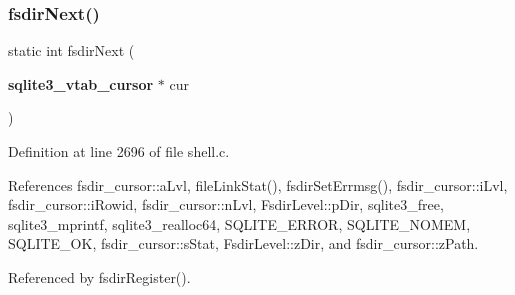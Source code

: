 \subsubsection{fsdir\+Next()}
{\footnotesize\ttfamily static int fsdir\+Next (\begin{DoxyParamCaption}\item[{\textbf{ sqlite3\+\_\+vtab\+\_\+cursor} $\ast$}]{cur }\end{DoxyParamCaption})\hspace{0.3cm}{\ttfamily [static]}}



Definition at line 2696 of file shell.\+c.



References fsdir\+\_\+cursor\+::a\+Lvl, file\+Link\+Stat(), fsdir\+Set\+Errmsg(), fsdir\+\_\+cursor\+::i\+Lvl, fsdir\+\_\+cursor\+::i\+Rowid, fsdir\+\_\+cursor\+::n\+Lvl, Fsdir\+Level\+::p\+Dir, sqlite3\+\_\+free, sqlite3\+\_\+mprintf, sqlite3\+\_\+realloc64, S\+Q\+L\+I\+T\+E\+\_\+\+E\+R\+R\+OR, S\+Q\+L\+I\+T\+E\+\_\+\+N\+O\+M\+EM, S\+Q\+L\+I\+T\+E\+\_\+\+OK, fsdir\+\_\+cursor\+::s\+Stat, Fsdir\+Level\+::z\+Dir, and fsdir\+\_\+cursor\+::z\+Path.



Referenced by fsdir\+Register().


